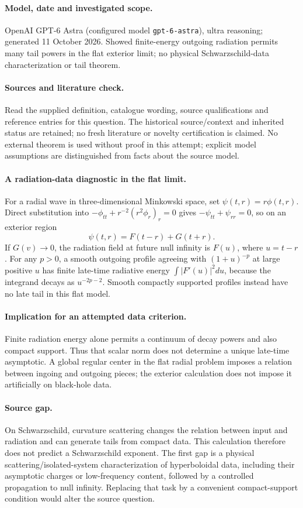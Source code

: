 \documentclass[11pt]{article}
\begin{document}
\paragraph{Model, date and investigated scope.}
OpenAI GPT-6 Astra (configured model \texttt{gpt-6-astra}), ultra reasoning; generated 11 October 2026. Showed finite-energy outgoing radiation permits many tail powers in the flat exterior limit; no physical Schwarzschild-data characterization or tail theorem.

\paragraph{Sources and literature check.}
Read the supplied definition, catalogue wording, source qualifications and reference entries for this question. The historical source/context and inherited status are retained; no fresh literature or novelty certification is claimed. No external theorem is used without proof in this attempt; explicit model assumptions are distinguished from facts about the source model.

\paragraph{A radiation-data diagnostic in the flat limit.} For a radial wave in three-dimensional Minkowski space, set \(\psi(t,r)=r\phi(t,r)\). Direct substitution into \(-\phi_{tt}+r^{-2}(r^2\phi_r)_r=0\) gives \(-\psi_{tt}+\psi_{rr}=0\), so on an exterior region
\[
 \psi(t,r)=F(t-r)+G(t+r).
\]
If \(G(v)\to0\), the radiation field at future null infinity is \(F(u)\), where \(u=t-r\). For any \(p>0\), a smooth outgoing profile agreeing with \((1+u)^{-p}\) at large positive \(u\) has finite late-time radiative energy \(\int|F'(u)|^2du\), because the integrand decays as \(u^{-2p-2}\). Smooth compactly supported profiles instead have no late tail in this flat model.
\paragraph{Implication for an attempted data criterion.} Finite radiation energy alone permits a continuum of decay powers and also compact support. Thus that scalar norm does not determine a unique late-time asymptotic. A global regular center in the flat radial problem imposes a relation between ingoing and outgoing pieces; the exterior calculation does not impose it artificially on black-hole data.
\paragraph{Source gap.} On Schwarzschild, curvature scattering changes the relation between input and radiation and can generate tails from compact data. This calculation therefore does not predict a Schwarzschild exponent. The first gap is a physical scattering/isolated-system characterization of hyperboloidal data, including their asymptotic charges or low-frequency content, followed by a controlled propagation to null infinity. Replacing that task by a convenient compact-support condition would alter the source question.
\end{document}
